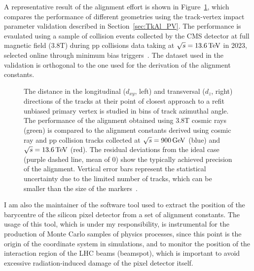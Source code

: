 A representative result of the alignment effort is shown in Figure~\ref{fig:TkAl2023},
which compares the performance of different geometries
using the track-vertex impact parameter validation described in Section~\ref{sec:TkAl_PV}.
The performance is evaulated using a sample of collision events collected by the CMS detector at full magnetic field (3.8\unit{T})
during pp collisions data taking at $\sqrt{s} = 13.6\,\text{Te\hspace{-.08em}V}$ in 2023, selected online through minimum bias triggers~\cite{CMS-DP-2023-039}.
The dataset used in the validation is orthogonal to the one used for the derivation of the alignment constants.

\begin{figure}
%
\caption{The distance in the longitudinal ($d_{xy}$, left) and transversal ($d_z$, right) directions
  of the tracks at their point of closest approach to a refit unbiased primary vertex is studied in bins of track azimuthal angle.
  The performance of the alignment obtained using 3.8\unit{T} cosmic rays (green) is compared to the alignment constants
  derived using cosmic ray and pp collision tracks collected at $\sqrt{s} = 900\,\text{Ge\hspace{-.08em}V}$ (blue) and $\sqrt{s} = 13.6\,\text{Te\hspace{-.08em}V}$ (red).
  The residual deviations from the ideal case (purple dashed line, mean of 0) show the typically achieved precision of the alignment.
  Vertical error bars represent the statistical uncertainty due to the limited number of tracks, which can be smaller than the size of the markers~\cite{CMS-DP-2023-039}.
}
\label{fig:TkAl2023}
\end{figure}

I am also the maintainer of the software tool used to extract the position of the barycentre of the silicon pixel detector from a set of alignment constants.
The usage of this tool, which is under my responsibility, is instrumental for
the production of Monte Carlo samples of physics processes, since this point is the origin of the coordinate system in simulations,
and to monitor the position of the interaction region of the LHC beams (beamspot),
which is important to avoid excessive radiation-induced damage of the pixel detector itself.
